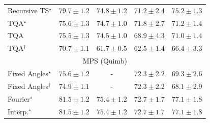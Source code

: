 \begin{tabular}{l|cccc|}
Recursive TS$^\star$ & {\cellcolor[HTML]{760C71}} \color[HTML]{F1F1F1} $79.7\pm 1.2$ & {\cellcolor[HTML]{8A56A7}} \color[HTML]{F1F1F1} $74.8\pm 1.2$ & {\cellcolor[HTML]{8C8CC1}} \color[HTML]{F1F1F1} $71.2\pm 2.4$ & {\cellcolor[HTML]{8950A4}} \color[HTML]{F1F1F1} $75.2\pm 1.3$ \\
TQA$^\star$ & {\cellcolor[HTML]{894BA2}} \color[HTML]{F1F1F1} $75.6\pm 1.3$ & {\cellcolor[HTML]{8A58A8}} \color[HTML]{F1F1F1} $74.7\pm 1.0$ & {\cellcolor[HTML]{8C82BC}} \color[HTML]{F1F1F1} $71.8\pm 2.7$ & {\cellcolor[HTML]{8C8CC1}} \color[HTML]{F1F1F1} $71.2\pm 1.4$ \\
TQA & {\cellcolor[HTML]{894CA2}} \color[HTML]{F1F1F1} $75.5\pm 1.3$ & {\cellcolor[HTML]{8A5AA9}} \color[HTML]{F1F1F1} $74.5\pm 1.0$ & {\cellcolor[HTML]{96ABD1}} \color[HTML]{F1F1F1} $68.9\pm 4.3$ & {\cellcolor[HTML]{8C8FC2}} \color[HTML]{F1F1F1} $71.0\pm 1.4$ \\
TQA$^\dagger$ & {\cellcolor[HTML]{8C93C4}} \color[HTML]{F1F1F1} $70.7\pm 1.1$ & {\cellcolor[HTML]{E1EDF5}} \color[HTML]{000000} $61.7\pm 0.5$ & {\cellcolor[HTML]{DAE7F1}} \color[HTML]{000000} $62.5\pm 1.4$ & {\cellcolor[HTML]{ACC6DF}} \color[HTML]{000000} $66.4\pm 3.3$ \\
\cline{1-5}
\multicolumn{5}{c}{\rule{0pt}{8pt}MPS (Quimb)} \\
\midrule
Fixed Angles$^\star$ & {\cellcolor[HTML]{D35406}} \color[HTML]{F1F1F1} $75.6\pm 1.2$ & {\cellcolor[HTML]{000000}} \color[HTML]{F1F1F1} {\cellcolor{white}} \color{black} - & {\cellcolor[HTML]{F27F1B}} \color[HTML]{F1F1F1} $72.3\pm 2.2$ & {\cellcolor[HTML]{FEAB39}} \color[HTML]{000000} $69.3\pm 2.6$ \\
Fixed Angles$^\dagger$ & {\cellcolor[HTML]{DB5D0B}} \color[HTML]{F1F1F1} $74.9\pm 1.1$ & {\cellcolor[HTML]{000000}} \color[HTML]{F1F1F1} {\cellcolor{white}} \color{black} - & {\cellcolor[HTML]{F27F1B}} \color[HTML]{F1F1F1} $72.3\pm 2.2$ & {\cellcolor[HTML]{FEBD49}} \color[HTML]{000000} $68.1\pm 2.9$ \\
Fourier$^\star$ & {\cellcolor[HTML]{6E2706}} \color[HTML]{F1F1F1} $81.5\pm 1.2$ & {\cellcolor[HTML]{D55607}} \color[HTML]{F1F1F1} $75.4\pm 1.2$ & {\cellcolor[HTML]{F07919}} \color[HTML]{F1F1F1} $72.7\pm 1.7$ & {\cellcolor[HTML]{BC4503}} \color[HTML]{F1F1F1} $77.1\pm 1.8$ \\
Interp.$^\star$ & {\cellcolor[HTML]{6E2706}} \color[HTML]{F1F1F1} $81.5\pm 1.2$ & {\cellcolor[HTML]{D55607}} \color[HTML]{F1F1F1} $75.4\pm 1.2$ & {\cellcolor[HTML]{F07919}} \color[HTML]{F1F1F1} $72.7\pm 1.7$ & {\cellcolor[HTML]{BC4503}} \color[HTML]{F1F1F1} $77.1\pm 1.8$ \\

\end{tabular}
